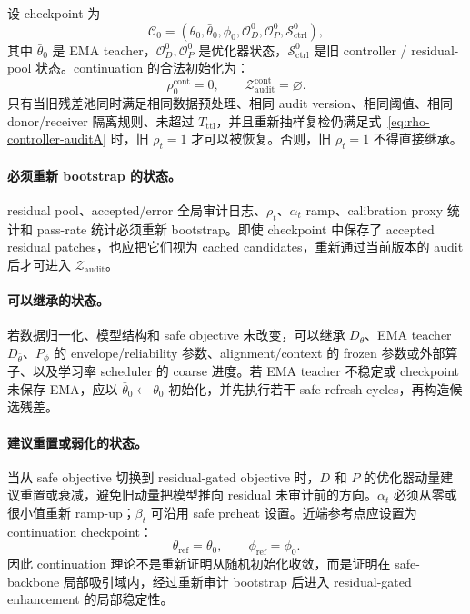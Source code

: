 \documentclass[11pt,a4paper,UTF8,fontset=fandol]{ctexart}
\theoremstyle{definition}
\newcommand{\cZ}{\mathcal{Z}}
\begin{document}
设 checkpoint 为
\begin{equation}
    \mathcal C_0=(\theta_0,\bar\theta_0,\phi_0,\mathcal O_D^0,\mathcal O_P^0,\mathcal S_{\mathrm{ctrl}}^0),
\end{equation}
其中 $\bar\theta_0$ 是 EMA teacher，$\mathcal O_D^0,\mathcal O_P^0$ 是优化器状态，$\mathcal S_{\mathrm{ctrl}}^0$ 是旧 controller / residual-pool 状态。continuation 的合法初始化为：
\begin{equation}
    \rho_{0}^{\mathrm{cont}}=0,
    \qquad
    \cZ_{\mathrm{audit}}^{\mathrm{cont}}=\varnothing.
\end{equation}
只有当旧残差池同时满足相同数据预处理、相同 audit version、相同阈值、相同 donor/receiver 隔离规则、未超过 $T_{\mathrm{ttl}}$，并且重新抽样复检仍满足式~\eqref{eq:rho-controller-auditA} 时，旧 $\rho_t=1$ 才可以被恢复。否则，旧 $\rho_t=1$ 不得直接继承。

\paragraph{必须重新 bootstrap 的状态。}
residual pool、accepted/error 全局审计日志、$\rho_t$、$\alpha_t$ ramp、calibration proxy 统计和 pass-rate 统计必须重新 bootstrap。即使 checkpoint 中保存了 accepted residual patches，也应把它们视为 cached candidates，重新通过当前版本的 audit 后才可进入 $\cZ_{\mathrm{audit}}$。

\paragraph{可以继承的状态。}
若数据归一化、模型结构和 safe objective 未改变，可以继承 $D_\theta$、EMA teacher $D_{\bar\theta}$、$P_\phi$ 的 envelope/reliability 参数、alignment/context 的 frozen 参数或外部算子、以及学习率 scheduler 的 coarse 进度。若 EMA teacher 不稳定或 checkpoint 未保存 EMA，应以 $\bar\theta_0\leftarrow\theta_0$ 初始化，并先执行若干 safe refresh cycles，再构造候选残差。

\paragraph{建议重置或弱化的状态。}
当从 safe objective 切换到 residual-gated objective 时，$D$ 和 $P$ 的优化器动量建议重置或衰减，避免旧动量把模型推向 residual 未审计前的方向。$\alpha_t$ 必须从零或很小值重新 ramp-up；$\beta_t$ 可沿用 safe preheat 设置。近端参考点应设置为 continuation checkpoint：
\begin{equation}
    \theta_{\mathrm{ref}}=\theta_0,
    \qquad
    \phi_{\mathrm{ref}}=\phi_0.
\end{equation}
因此 continuation 理论不是重新证明从随机初始化收敛，而是证明在 safe-backbone 局部吸引域内，经过重新审计 bootstrap 后进入 residual-gated enhancement 的局部稳定性。
\end{document}
